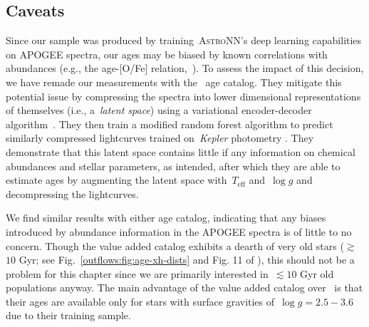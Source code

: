 \subsection{Caveats}
\label{outflows:sec:empirical:caveats}
Since our sample was produced by training~\textsc{AstroNN}'s deep learning
capabilities on APOGEE spectra, our ages may be biased by known correlations
with abundances (e.g., the age-[O/Fe] relation,~\citealt{Feuillet2019}).
To assess the impact of this decision, we have remade our measurements with
the~\citet{Leung2023} age catalog.
They mitigate this potential issue by compressing the spectra into lower
dimensional representations of themselves (i.e., a~\textit{latent space}) using
a variational encoder-decoder algorithm~\citep[e.g.,][]{LeCun2015}.
They then train a modified random forest algorithm to predict similarly
compressed lightcurves trained on~\textit{Kepler} photometry
\citep{Borucki2010}.
They demonstrate that this latent space contains little if any information on
chemical abundances and stellar parameters, as intended, after which they are
able to estimate ages by augmenting the latent space with~$T_\text{eff}$
and~$\log g$ and decompressing the lightcurves.
\par
We find similar results with either age catalog, indicating that any biases
introduced by abundance information in the APOGEE spectra is of little to no
concern.
Though the value added catalog exhibits a dearth of very old stars
($\gtrsim$$10$ Gyr; see Fig.~\ref{outflows:fig:age-xh-dists} and Fig. 11 of
\citealt{Leung2023}), this should not be a problem for this chapter since we
are primarily interested in~$\lesssim$$10$ Gyr old populations anyway.
The main advantage of the value added catalog over~\citet{Leung2023} is that
their ages are available only for stars with surface gravities
of~$\log g = 2.5 - 3.6$ due to their training sample.
